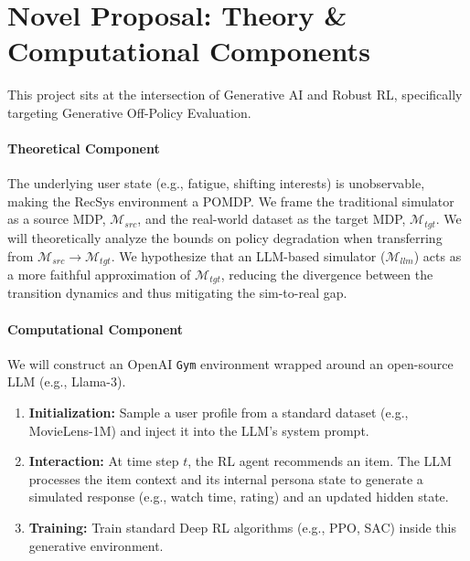 \documentclass[]{../0_aga-homework}
\begin{document}
\section*{Novel Proposal: Theory \& Computational Components}
This project sits at the intersection of Generative AI and Robust RL, specifically targeting Generative Off-Policy Evaluation.

\paragraph{Theoretical Component}
The underlying user state (e.g., fatigue, shifting interests) is unobservable, making the RecSys environment a POMDP. We frame the traditional simulator as a source MDP, $\mathcal{M}_{src}$, and the real-world dataset as the target MDP, $\mathcal{M}_{tgt}$. We will theoretically analyze the bounds on policy degradation when transferring from $\mathcal{M}_{src} \to \mathcal{M}_{tgt}$. We hypothesize that an LLM-based simulator ($\mathcal{M}_{llm}$) acts as a more faithful approximation of $\mathcal{M}_{tgt}$, reducing the divergence between the transition dynamics and thus mitigating the sim-to-real gap.

\paragraph{Computational Component}
We will construct an OpenAI \texttt{Gym} environment wrapped around an open-source LLM (e.g., Llama-3). 
\begin{enumerate}
    \item \textbf{Initialization:} Sample a user profile from a standard dataset (e.g., MovieLens-1M) and inject it into the LLM's system prompt.
    \item \textbf{Interaction:} At time step $t$, the RL agent recommends an item. The LLM processes the item context and its internal persona state to generate a simulated response (e.g., watch time, rating) and an updated hidden state.
    \item \textbf{Training:} Train standard Deep RL algorithms (e.g., PPO, SAC) inside this generative environment. 
\end{enumerate}
\end{document}
